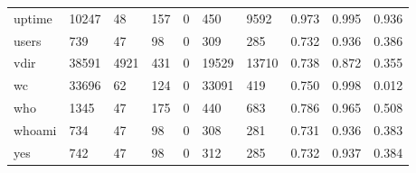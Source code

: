 \begin{longtable}{lp{1.3cm}p{1.3cm}p{1.3cm}p{1.3cm}p{1.3cm}p{1.3cm}p{1.3cm}p{1.3cm}p{1.3cm}}
uptime    &                  10247 &                                 48 &                               157 &                                0 &                               450 &                            9592 &                                0.973 &                                  0.995 &                                0.936 \\
users     &                    739 &                                 47 &                                98 &                                0 &                               309 &                             285 &                                0.732 &                                  0.936 &                                0.386 \\
vdir      &                  38591 &                               4921 &                               431 &                                0 &                             19529 &                           13710 &                                0.738 &                                  0.872 &                                0.355 \\
wc        &                  33696 &                                 62 &                               124 &                                0 &                             33091 &                             419 &                                0.750 &                                  0.998 &                                0.012 \\
who       &                   1345 &                                 47 &                               175 &                                0 &                               440 &                             683 &                                0.786 &                                  0.965 &                                0.508 \\
whoami    &                    734 &                                 47 &                                98 &                                0 &                               308 &                             281 &                                0.731 &                                  0.936 &                                0.383 \\
yes       &                    742 &                                 47 &                                98 &                                0 &                               312 &                             285 &                                0.732 &                                  0.937 &                                0.384 \\
\end{longtable}
